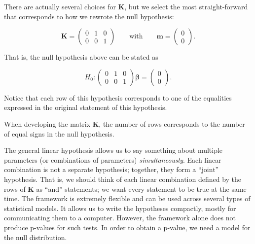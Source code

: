 \documentclass[
  letterpaper,
  DIV=11,
  numbers=noendperiod]{scrreprt}
\theoremstyle{definition}
\theoremstyle{definition}
\theoremstyle{remark}
\begin{document}
There are actually several choices for \(\mathbf{K}\), but we select the
most straight-forward that corresponds to how we rewrote the null
hypothesis:

\[\mathbf{K} = \begin{pmatrix}
0 & 1 & 0 \\
0 & 0 & 1 \end{pmatrix} \qquad \text{with} \qquad \mathbf{m} = \begin{pmatrix}
0 \\ 0 \end{pmatrix}.\]

That is, the null hypothesis above can be stated as

\[H_0: \begin{pmatrix} 0 & 1 & 0 \\ 0 & 0 & 1 \end{pmatrix} \boldsymbol{\beta} = \begin{pmatrix} 0 \\ 0 \end{pmatrix}.\]

Notice that each row of this hypothesis corresponds to one of the
equalities expressed in the original statement of this hypothesis.

\begin{tcolorbox}[enhanced jigsaw, bottomrule=.15mm, titlerule=0mm, bottomtitle=1mm, colback=white, coltitle=black, rightrule=.15mm, leftrule=.75mm, toprule=.15mm, toptitle=1mm, left=2mm, opacityback=0, colframe=quarto-callout-note-color-frame, breakable, title=\textcolor{quarto-callout-note-color}{\faInfo}\hspace{0.5em}{Note}, arc=.35mm, colbacktitle=quarto-callout-note-color!10!white, opacitybacktitle=0.6]

When developing the matrix \(\mathbf{K}\), the number of rows
corresponds to the number of equal signs in the null hypothesis.

\end{tcolorbox}

The general linear hypothesis allows us to say something about multiple
parameters (or combinations of parameters) \emph{simultaneously}. Each
linear combination is not a separate hypothesis; together, they form a
``joint'' hypothesis. That is, we should think of each linear
combination defined by the rows of \(\mathbf{K}\) as ``and'' statements;
we want every statement to be true at the same time. The framework is
extremely flexible and can be used across several types of statistical
models. It allows us to write the hypotheses compactly, mostly for
communicating them to a computer. However, the framework alone does not
produce p-values for such tests. In order to obtain a p-value, we need a
model for the null distribution.
\end{document}
